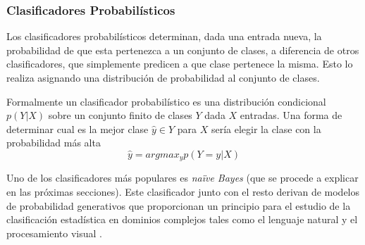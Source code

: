 \subsubsection{Clasificadores Probabilísticos}

		Los clasificadores probabilísticos determinan, dada una entrada nueva, la probabilidad de que esta pertenezca a un conjunto de clases, a diferencia de otros clasificadores, que simplemente predicen a que clase pertenece la misma. Esto lo realiza asignando una distribución de probabilidad al conjunto de clases.
	
	Formalmente un clasificador probabilístico es una distribución condicional $p(Y|X)$ sobre un conjunto finito de clases $Y$ dada $X$ entradas. Una forma de determinar cual es la mejor clase $\hat{y} \in Y$ para $X$ sería elegir la clase con la probabilidad más alta
	$$\hat{y} = argmax_{y}p(Y=y|X) $$
	
	Uno de los clasificadores más populares es \textit{na\"{i}ve Bayes} (que se procede a explicar en las próximas secciones). Este clasificador junto con el resto derivan de modelos de probabilidad generativos que proporcionan un principio para el estudio de la clasificación estadística en dominios complejos tales como el lenguaje natural y el procesamiento visual \cite{GargRo01}.
